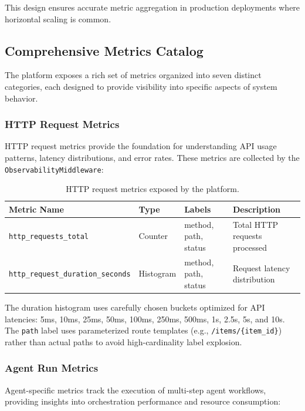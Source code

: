 This design ensures accurate metric aggregation in production deployments where horizontal scaling is common.

\subsection{Comprehensive Metrics Catalog}
\label{subsec:metrics-catalog}

The platform exposes a rich set of metrics organized into seven distinct categories, each designed to provide visibility into specific aspects of system behavior.

\subsubsection{HTTP Request Metrics}

HTTP request metrics provide the foundation for understanding API usage patterns, latency distributions, and error rates. These metrics are collected by the \texttt{ObservabilityMiddleware}:

\begin{table}[ht]
\centering
\caption{HTTP request metrics exposed by the platform.}
\label{tab:http-metrics}
\small
\begin{tabularx}{\textwidth}{lllX}
\hline
\textbf{Metric Name} & \textbf{Type} & \textbf{Labels} & \textbf{Description} \\
\hline
\texttt{http\_requests\_total} & Counter & method, path, status & Total HTTP requests processed \\
\texttt{http\_request\_duration\_seconds} & Histogram & method, path, status & Request latency distribution \\
\hline
\end{tabularx}
\end{table}

The duration histogram uses carefully chosen buckets optimized for API latencies: 5ms, 10ms, 25ms, 50ms, 100ms, 250ms, 500ms, 1s, 2.5s, 5s, and 10s. The \texttt{path} label uses parameterized route templates (e.g., \texttt{/items/\{item\_id\}}) rather than actual paths to avoid high-cardinality label explosion.

\subsubsection{Agent Run Metrics}

Agent-specific metrics track the execution of multi-step agent workflows, providing insights into orchestration performance and resource consumption:

